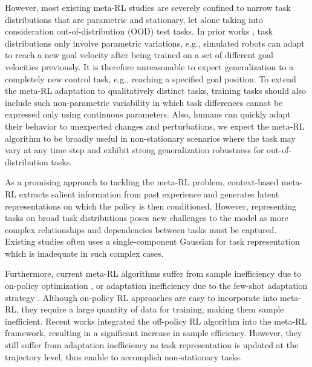 \documentclass[letterpaper]{article} %
\begin{document}

However, most existing meta-RL studies are severely confined to narrow task distributions that are parametric and stationary, let alone taking into consideration out-of-distribution (OOD) test tasks. In prior works \cite{MAML, E-MAML, Reptile, ProMP, RL2, MAESN, PEARL, MQL, asTaskInference, Focal,  VariBAD, Hyper-X}, task distributions only involve parametric variations, e.g., simulated robots can adapt to reach a new goal velocity after being trained on a set of different goal velocities previously. It is therefore unreasonable to expect generalization to a completely new control task, e.g., reaching a specified goal position. To extend the meta-RL adaptation to qualitatively distinct tasks, training tasks should also include such non-parametric variability in which task differences cannot be expressed only using continuous parameters. Also, humans can quickly adapt their behavior to unexpected changes and perturbations, we expect the meta-RL algorithm to be broadly useful in non-stationary scenarios where the task may vary at any time step and exhibit strong generalization robustness for out-of-distribution tasks. 

As a promising approach to tackling the meta-RL problem, context-based meta-RL \cite{RL2, PEARL, MQL, asTaskInference, VariBAD, MCAT} extracts salient information from past experience and generates latent representations on which the policy is then conditioned. However, representing tasks on broad task distributions poses new challenges to the model as more complex relationships and dependencies between tasks must be captured. Existing studies \cite{PEARL, VariBAD, MQL, Focal} often uses a single-component Gaussian for task representation which is inadequate in such complex cases.

Furthermore, current meta-RL algorithms suffer from sample inefficiency due to on-policy optimization \cite{MAML, E-MAML, Reptile, ProMP, RL2, MAESN, VariBAD, Hyper-X}, or adaptation inefficiency due to the few-shot adaptation strategy \cite{PEARL, MQL, Focal}. Although on-policy RL approaches are easy to incorporate into meta-RL, they require a large quantity of data for training, making them sample inefficient. Recent works \cite{PEARL, MQL, Focal} integrated the off-policy RL algorithm into the meta-RL framework, resulting in a significant increase in sample efficiency. However, they still suffer from adaptation inefficiency as task representation is updated at the trajectory level, thus enable to accomplish non-stationary tasks.
\end{document}
